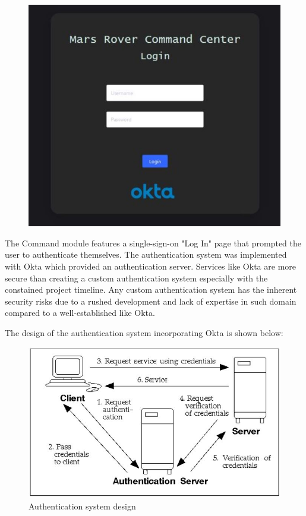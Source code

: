 \documentclass[11pt, a4paper]{article}
\begin{document}
\begin{figure} [h!]
    \centering
    \includegraphics[scale=0.5]{Command_login.JPG}
\end{figure}

The Command module features a single-sign-on "Log In" page that prompted the user to authenticate themselves. The authentication system was implemented with Okta which provided an authentication server. Services like Okta are more secure than creating a custom authentication system especially with the constained project timeline. Any custom authentication system has the inherent security risks due to a rushed development and lack of expertise in such domain compared to a well-established like Okta. 

The design of the authentication system incorporating Okta is shown below:
\begin{figure}[!h]
    \centering
    \includegraphics[scale=0.5]{Command_authen.JPG}
    \caption{Authentication system design \cite{Authentication}}
\end{figure}
\end{document}
